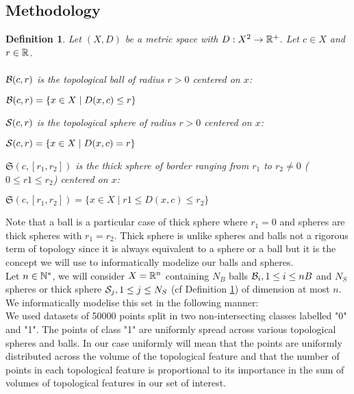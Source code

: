 \documentclass[12pt, a4paper]{article}
\newtheorem{definition}{Definition}
\begin{document}
\subsection{Methodology}

\begin{definition}
  Let $(X, D)$ be a metric space with $D : X^2 \to \R^+$. Let $c \in X$ and $r \in \R$.\\
  \\
  $\B(c,r)$ is the topological ball of radius $r > 0 $ centered on $x$:
  \begin{center}
    $\B(c,r) = \{ x \in X \mid D(x,c) \le r \}$ 
  \end{center}
  $\S(c,r)$ is the topological sphere of radius $r > 0$ centered on $x$:
  \begin{center}
    $\S(c,r) = \{ x \in X \mid D(x,c) = r \}$ 
  \end{center}
  $\mathfrak{S}(c,[r_1,r_2])$ is the thick sphere of border ranging from $r_1$ to $r_2 \ne 0$ ($0 \le r1 \le r_2$) centered on $x$:
  \begin{center}
    $\mathfrak{S}(c,[r_1, r_2]) = \{ x \in X \mid r1 \le D(x,c) \le r_2 \}$ 
  \end{center}
  \label{def:ball_sphere}
\end{definition}

Note that a ball is a particular case of thick sphere where $r_1 = 0$ and spheres are thick spheres with $r_1 = r_2$. Thick sphere is unlike spheres and balls not a rigorous term of topology since it is always equivalent to a sphere or a ball but it is the concept we will use to informatically modelize our balls and spheres.\\

Let $n \in \N^*$, we will consider $X = \R^n$ containing $N_B$ balls $\B_i, 1 \le i \le nB$ and $N_S$ spheres or thick sphere $\S_j, 1 \le j \le N_S$ (cf Definition \ref{def:ball_sphere}) of dimension at most $n$. We informatically modelise this set in the following manner: \\ 

We used datasets of 50000 points split in two non-intersecting classes labelled "0" and "1". The points of class "1" are uniformly spread across various topological spheres and balls. In our case uniformly will mean that the points are uniformly distributed across the volume of the topological feature and that the number of points in each topological feature is proportional to its importance in the sum of volumes of topological features in our set of interest. \\
\end{document}

